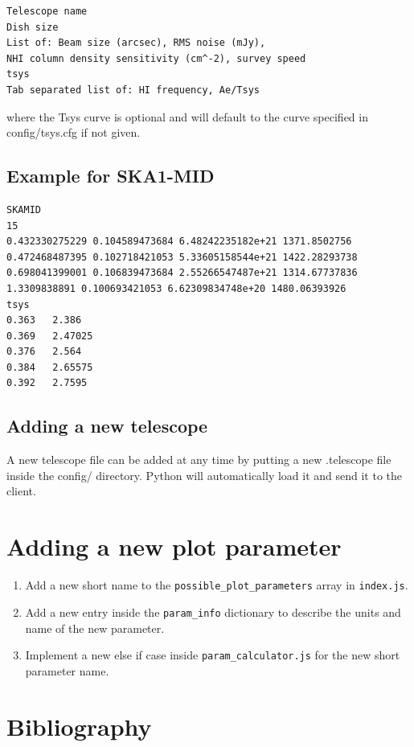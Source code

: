 \documentclass[11pt]{article}
\begin{document}
\begin{verbatim}
Telescope name
Dish size
List of: Beam size (arcsec), RMS noise (mJy), 
NHI column density sensitivity (cm^-2), survey speed
tsys
Tab separated list of: HI frequency, Ae/Tsys
\end{verbatim}
where the Tsys curve is optional and will default to the curve specified in config/tsys.cfg if not given. \subsection{Example for SKA1-MID}
\begin{verbatim}
SKAMID
15 
0.432330275229 0.104589473684 6.48242235182e+21 1371.8502756
0.472468487395 0.102718421053 5.33605158544e+21 1422.28293738
0.698041399001 0.106839473684 2.55266547487e+21 1314.67737836
1.3309838891 0.100693421053 6.62309834748e+20 1480.06393926
tsys
0.363	2.386
0.369	2.47025
0.376	2.564
0.384	2.65575
0.392	2.7595
\end{verbatim}
\subsection{Adding a new telescope}
A new telescope file can be added at any time by putting a new .telescope file inside the config/ directory. Python will automatically load it and send it to the client.
\section{Adding a new plot parameter}
\begin{enumerate}
\item Add a new short name to the \verb|possible_plot_parameters| array in \verb|index.js|.
\item Add a new entry inside the \verb|param_info| dictionary to describe the units and name of the new parameter.
\item Implement a new else if case inside \verb|param_calculator.js| for the new short parameter name.
\end{enumerate}

\section{Bibliography}
\printbibliography
\end{document}
